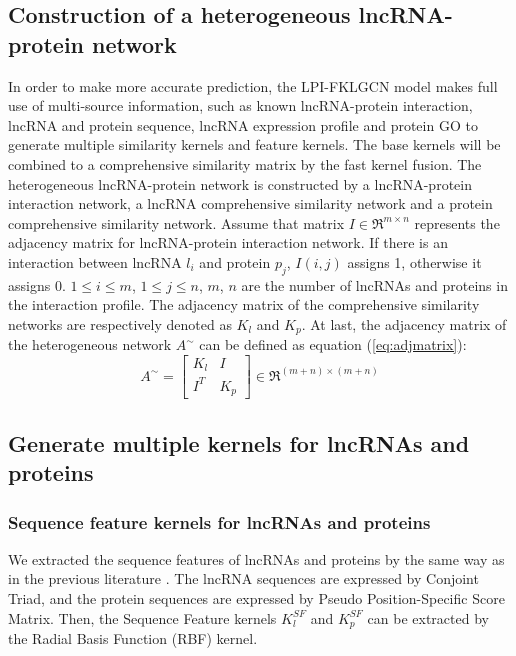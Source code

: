 \documentclass[fleqn,10pt]{wlscirep}
\begin{document}
\subsection*{Construction of a heterogeneous lncRNA-protein network}
In order to make more accurate prediction, the LPI-FKLGCN model makes full use of multi-source information, such as known lncRNA-protein interaction, lncRNA and protein sequence, lncRNA expression profile and protein GO to generate multiple similarity kernels and feature kernels. The base kernels will be combined to a comprehensive similarity matrix by the fast kernel fusion. The heterogeneous lncRNA-protein network is constructed by a lncRNA-protein interaction network, a lncRNA comprehensive similarity network and a protein comprehensive similarity network. Assume that matrix ${{I}} \in {\Re ^{m \times n}}$ represents the adjacency matrix for lncRNA-protein interaction network. If there is an interaction between lncRNA ${{l_i}}$ and protein ${{p_j}}$, ${{I}}(i,j)$ assigns 1, otherwise it assigns 0. $1 \le i \le m$, $1 \le j \le n$, $m$, $n$ are the number of lncRNAs and proteins in the interaction profile. The adjacency matrix of the comprehensive similarity networks are respectively denoted as ${{{K}}_l}$ and ${{{K}}_p}$. At last, the adjacency matrix of the heterogeneous network ${A^ \sim }$ can be defined as equation (\ref{eq:adjmatrix}):
\begin{equation}\label{eq:adjmatrix}
{A^ \sim } = \left[ {\begin{array}{*{20}{c}}
{{{{K}}_l}}&{{I}}\\
{{{{I}}^T}}&{{{{K}}_p}}
\end{array}} \right] \in {\Re ^{(m + n) \times (m + n)}}
\end{equation}
\subsection*{Generate multiple kernels for lncRNAs and proteins}
\subsubsection*{Sequence feature kernels for lncRNAs and proteins}
We extracted the sequence features of lncRNAs and proteins by the same way as in the previous literature \cite{Shen2019}. The lncRNA sequences are expressed by Conjoint Triad, and the protein sequences are expressed by Pseudo Position-Specific Score Matrix. Then, the Sequence Feature kernels ${{K}}_l^{SF}$ and ${{K}}_p^{SF}$ can be extracted by the Radial Basis Function (RBF) kernel.
\end{document}
